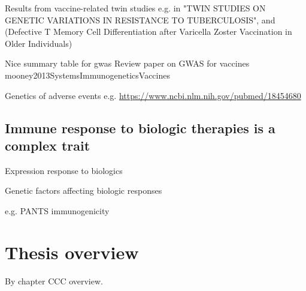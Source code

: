 \begin{outline}
    Results from vaccine-related twin studies e.g. in "TWIN STUDIES ON GENETIC VARIATIONS IN RESISTANCE TO TUBERCULOSIS", and (Defective T Memory Cell Differentiation after Varicella Zoster Vaccination in Older Individuals)

    Nice summary table for gwas 
    Review paper on GWAS for vaccines mooney2013SystemsImmunogeneticsVaccines

    Genetics of adverse events e.g. \url{https://www.ncbi.nlm.nih.gov/pubmed/18454680}

\subsection{Immune response to biologic therapies is a complex trait}

Expression response to biologics

Genetic factors affecting biologic responses

e.g. PANTS immunogenicity

\section{Thesis overview}

By chapter CCC overview.

\end{outline}


